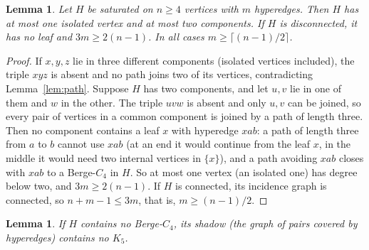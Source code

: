 \documentclass[11pt]{article}
\newtheorem{lemma}[theorem]{Lemma}
\theoremstyle{remark}
\begin{document}
\begin{lemma}\label{lem:basic}
Let $H$ be saturated on $n\ge4$ vertices with $m$ hyperedges. Then $H$ has
at most one isolated vertex and at most two components. If $H$ is
disconnected, it has no leaf and $3m\ge2(n-1)$. In all cases
$m\ge\lceil(n-1)/2\rceil$.
\end{lemma}

\begin{proof}
If $x,y,z$ lie in three different components (isolated vertices
included), the triple $xyz$ is absent and no path joins two of its
vertices, contradicting Lemma~\ref{lem:path}. Suppose $H$ has two
components, and let $u,v$ lie in one of them and $w$ in the other. The
triple $uvw$ is absent and only $u,v$ can be joined, so every pair of
vertices in a common component is joined by a path of length three.
Then no component contains a leaf $x$ with hyperedge $xab$: a path of
length three from $a$ to $b$ cannot use $xab$ (at an end it would continue
from the leaf $x$, in the middle it would need two internal vertices in
$\{x\}$), and a path avoiding $xab$ closes with $xab$ to a Berge-$C_4$ in
$H$. So at most one vertex (an isolated one) has degree below two, and
$3m\ge2(n-1)$. If $H$ is connected, its incidence graph is connected,
so $n+m-1\le 3m$, that is, $m\ge(n-1)/2$.
\end{proof}

\begin{lemma}\label{lem:shadow}
If $H$ contains no Berge-$C_4$, its shadow (the graph of pairs covered by
hyperedges) contains no $K_5$.
\end{lemma}
\end{document}
